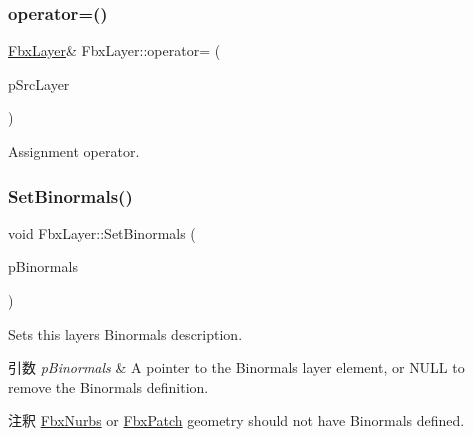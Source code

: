 \mbox{\label{class_fbx_layer_a3563fcb2cc9c4b00ace7450203371ee6}} 
\subsubsection{\texorpdfstring{operator=()}{operator=()}}
{\footnotesize\ttfamily \hyperlink{class_fbx_layer}{Fbx\+Layer}\& Fbx\+Layer\+::operator= (\begin{DoxyParamCaption}\item[{\hyperlink{class_fbx_layer}{Fbx\+Layer} const \&}]{p\+Src\+Layer }\end{DoxyParamCaption})\hspace{0.3cm}{\ttfamily [protected]}}



Assignment operator. 

\mbox{\label{class_fbx_layer_a4b52fae069d3d906ce3699f8231315bf}} 
\subsubsection{\texorpdfstring{Set\+Binormals()}{SetBinormals()}}
{\footnotesize\ttfamily void Fbx\+Layer\+::\+Set\+Binormals (\begin{DoxyParamCaption}\item[{\hyperlink{class_fbx_layer_element_binormal}{Fbx\+Layer\+Element\+Binormal} $\ast$}]{p\+Binormals }\end{DoxyParamCaption})}

Sets this layer\textquotesingle{}s Binormals description. 
\begin{DoxyParams}{引数}
{\em p\+Binormals} & A pointer to the Binormals layer element, or {\ttfamily N\+U\+LL} to remove the Binormals definition. \\
\hline
\end{DoxyParams}
\begin{DoxyRemark}{注釈}
\hyperlink{class_fbx_nurbs}{Fbx\+Nurbs} or \hyperlink{class_fbx_patch}{Fbx\+Patch} geometry should not have Binormals defined. 
\end{DoxyRemark}
\mbox{\label{class_fbx_layer_a75d465b2a9349563471e7d1f8a983b2b}} 
